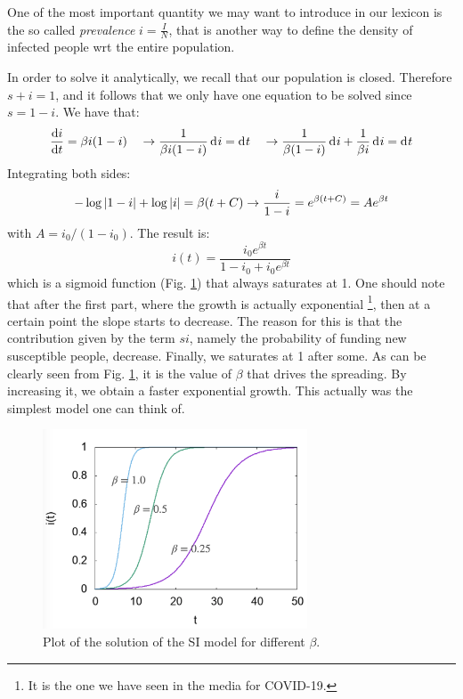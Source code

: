 \documentclass[../main/main.tex]{subfiles}
\begin{document}
One of the most important quantity we may want to introduce in our lexicon is the so called \textit{prevalence} $i = \frac{I}{N}$, that is another way to define the density of infected people wrt the entire population.

In order to solve it analytically, we recall that our population is closed. Therefore $s+i=1$, and it follows that we only have one equation to be solved since $s=1-i$.
We have that:
\begin{equation*}
  \dv{i}{t} = \beta i (1-i) \quad \rightarrow \frac{1}{\beta i (1-i)} \dd[]{i} = \dd[]{t} \quad \rightarrow \frac{1}{\beta (1-i)} \dd[]{i} + \frac{1}{\beta i} \dd[]{i} = \dd[]{t}
\end{equation*}
Integrating both sides:
\begin{equation*}
  - \log \abs{1-i} + \log \abs{i} = \beta (t+C) \rightarrow \frac{i}{1-i} = e^{\beta (t+C)} = A e^{\beta t}
\end{equation*}
with \( A = i_0/(1-i_0) \).
The result is:
\begin{equation}
  i(t) = \frac{i_0 e^{\beta t} }{1-i_0 + i_0 e^{\beta t} }
\end{equation}
which is a sigmoid function (Fig. \ref{fig:3_2}) that always saturates at 1. One should note that after the first part, where the growth is actually exponential \footnote{It is the one we have seen in the media for COVID-19.}, then at a certain point the slope starts to decrease. The reason for this is that the contribution given by the term $s i$, namely the probability of funding new susceptible people, decrease. Finally, we saturates at 1 after some. As can be clearly seen from Fig. \ref{fig:3_2}, it is the value of $\beta$ that drives the spreading. By increasing it, we obtain a faster exponential growth.
This actually was the simplest model one can think of.

\begin{figure}[h!]
\centering
\includegraphics[width=0.7\textwidth]{../lessons/image/03/2.png}
\caption{\label{fig:3_2} Plot of the solution of the SI model for different \( \beta  \).}
\end{figure}
\end{document}
